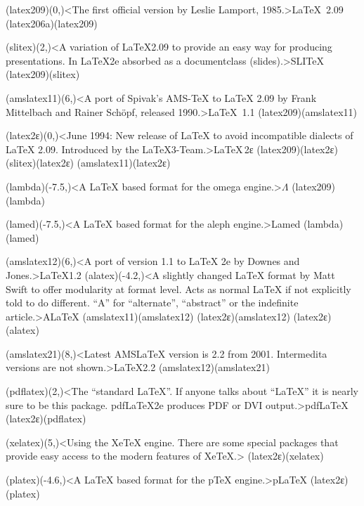 {	\steplayer[-2.5]
	\tonode[\vip](latex209)(0,\layer)<The first official version by Leslie Lamport, 1985.>{\LaTeX\ 2.09}
	\todraw(latex206a)(latex209)
	
	\steplayer[-2]
	\tonode(slitex)(2,\layer)<A variation of LaTeX2.09 to provide an easy way for producing presentations. In LaTeX2e absorbed as a documentclass (slides).>{SLI\TeX}
	\todraw(latex209)(slitex)
	
	\tonode(amslatex11)(6,\layer)<A port of Spivak's AMS-TeX to LaTeX 2.09 by Frank Mittelbach and Rainer Schöpf, released 1990.>{\AMS\LaTeX\ 1.1}
	\todraw(latex209)(amslatex11)
	
	\steplayer[-1.7]
	\tonode[\vip](latex2ε)(0,\layer)<June 1994: New release of LaTeX to avoid incompatible dialects of LaTeX 2.09. Introduced by the LaTeX3-Team.>{\LaTeX\,2\raisebox{-.5ex}ε}
	\todraw*(latex209)(latex2ε)
	\todraw[dashed](slitex)(latex2ε)
	\todraw[dashed](amslatex11)(latex2ε)

	\tonode[\experimental](lambda)(-7.5,\layer)<A LaTeX based format for the omega engine.>{$\Lambda$}
	\todraw(latex209)(lambda)
	\steplayer[-1.5]

	\tonode[\experimental](lamed)(-7.5,\layer)<A LaTeX based format for the aleph engine.>{Lamed}
	\todraw(lambda)(lamed)

	\steplayer[+1]
	\tonode(amslatex12)(6,\layer)<A port of version 1.1 to LaTeX 2e by Downes and Jones.>{\AMS\LaTeX 1.2}
	\tonode[\experimental](alatex)(-4.2,\layer)<A slightly changed LaTeX format by Matt Swift to offer modularity at format level. Acts as normal LaTeX if not explicitly told to do different. “A” for “alternate”, “abstract” or the indefinite article.>{A\LaTeX}
	\todraw(amslatex11)(amslatex12)
	\todraw(latex2ε)(amslatex12)
	\todraw(latex2ε)(alatex)
	\steplayer[-1.5]

	\tonode(amslatex21)(8,\layer)<Latest AMSLaTeX version is 2.2 from 2001. Intermedita versions are not shown.>{\AMS\LaTeX 2.2}
	\todraw(amslatex12)(amslatex21)
	\steplayer[-1.5]

	\tonode[\vip](pdflatex)(2,\layer)<The “standard LaTeX”. If anyone talks about “LaTeX” it is nearly sure to be this package. pdfLaTeX2e produces PDF or DVI output.>{pdf\LaTeX}
	\todraw*(latex2ε)(pdflatex)
	
	\tonode[\vip](xelatex)(5,\layer)<Using the XeTeX engine. There are some special packages that provide easy access to the modern features of XeTeX.>{\XeLaTeX}
	\todraw*(latex2ε)(xelatex)

	\tonode(platex)(-4.6,\layer)<A LaTeX based format for the pTeX engine.>{p\LaTeX}
	\todraw(latex2ε)(platex)
	
}
